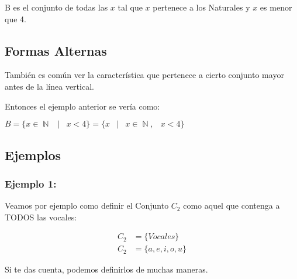 \documentclass[12pt, fleqn]{report}                             %
\DeclareMathOperator \Space {\quad}                             %
\DeclareMathOperator \MiniSpace {\;}                            %
\newcommand \Such {\MiniSpace|\MiniSpace}                       %
\DeclareMathOperator \Naturals  {\mathbb{N}}                     %
\begin{document}
                        B es el conjunto de todas las $x$ tal que $x$ pertenece a los Naturales
                        y $x$ es menor que 4.


                    \subsection*{Formas Alternas}
                    
                        También es común ver la característica que pertenece a cierto conjunto mayor
                        antes de la línea vertical.

                        Entonces el ejemplo anterior se vería como:

                        $B = \{ x \in \Naturals \Such x < 4 \} = \{ x \Such x \in \Naturals, \MiniSpace x < 4 \} $


                    
                \clearpage
                \subsection{Ejemplos} 

                \subsubsection*{Ejemplo 1:}

                    Veamos por ejemplo como definir el Conjunto $C_2$ como aquel que contenga a
                    TODOS las vocales:

                    \begin{equation*}   
                    \begin{split}   
                        C_2 &= \{ Vocales \}       \\
                        C_2 &= \{a, e, i, o, u \}
                    \end{split}   
                    \end{equation*}

                    Si te das cuenta, podemos definirlos de muchas maneras.


\end{document}

